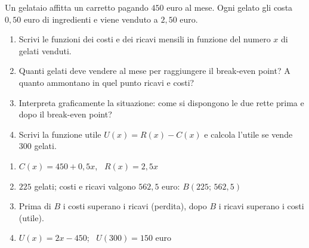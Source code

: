 \begin{question}[ID=4.2, subtitle={Break-even di un carretto dei gelati}, difficulty=media, tags={sistemi, break-even, grafici}]
Un gelataio affitta un carretto pagando $450$ euro al mese. Ogni gelato gli costa $0{,}50$ euro di ingredienti e viene venduto a $2{,}50$ euro.
\begin{enumerate}[label=\alph*),leftmargin=1.8cm]
    \item Scrivi le funzioni dei costi e dei ricavi mensili in funzione del numero $x$ di gelati venduti.
    \item Quanti gelati deve vendere al mese per raggiungere il break-even point? A quanto ammontano in quel punto ricavi e costi?
    \item Interpreta graficamente la situazione: come si dispongono le due rette prima e dopo il break-even point?
    \item Scrivi la funzione utile $U(x)=R(x)-C(x)$ e calcola l'utile se vende $300$ gelati.
\end{enumerate}
\begin{solution}
\begin{enumerate}[label=\alph*),leftmargin=1.8cm]
    \item $C(x)=450+0{,}5x$, \ $R(x)=2{,}5x$
    \item $225$ gelati; costi e ricavi valgono $562{,}5$ euro: $B(225;\,562{,}5)$
    \item Prima di $B$ i costi superano i ricavi (perdita), dopo $B$ i ricavi superano i costi (utile).
\begin{center}
\end{center}
    \item $U(x)=2x-450$; \ $U(300)=150$ euro
\end{enumerate}
\end{solution}
\begin{explanation}
\begin{enumerate}[label=\alph*),leftmargin=1.8cm]

\end{enumerate}
\end{explanation}
\end{question}
